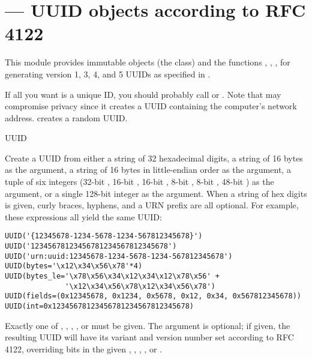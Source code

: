\section{ ---
         UUID objects according to RFC 4122}


This module provides immutable  objects (the  class)
and the functions , ,
,  for generating version 1, 3, 4,
and 5 UUIDs as specified in .

If all you want is a unique ID, you should probably call
 or .  Note that 
may compromise privacy since it creates a UUID containing the computer's
network address.   creates a random UUID.

\begin{classdesc}{UUID}{}

Create a UUID from either a string of 32 hexadecimal digits,
a string of 16 bytes as the  argument, a string of 16 bytes
in little-endian order as the  argument, a tuple of six
integers (32-bit , 16-bit ,
16-bit ,
8-bit , 8-bit , 48-bit )
as the  argument, or a single 128-bit integer as the 
argument.  When a string of hex digits is given, curly braces,
hyphens, and a URN prefix are all optional.  For example, these
expressions all yield the same UUID:

\begin{verbatim}
UUID('{12345678-1234-5678-1234-567812345678}')
UUID('12345678123456781234567812345678')
UUID('urn:uuid:12345678-1234-5678-1234-567812345678')
UUID(bytes='\x12\x34\x56\x78'*4)
UUID(bytes_le='\x78\x56\x34\x12\x34\x12\x78\x56' +
              '\x12\x34\x56\x78\x12\x34\x56\x78')
UUID(fields=(0x12345678, 0x1234, 0x5678, 0x12, 0x34, 0x567812345678))
UUID(int=0x12345678123456781234567812345678)
\end{verbatim}

Exactly one of , , , ,
or  must
be given.  The  argument is optional; if given, the
resulting UUID will have its variant and version number set according to
RFC 4122, overriding bits in the given , ,
, , or .

\end{classdesc}


